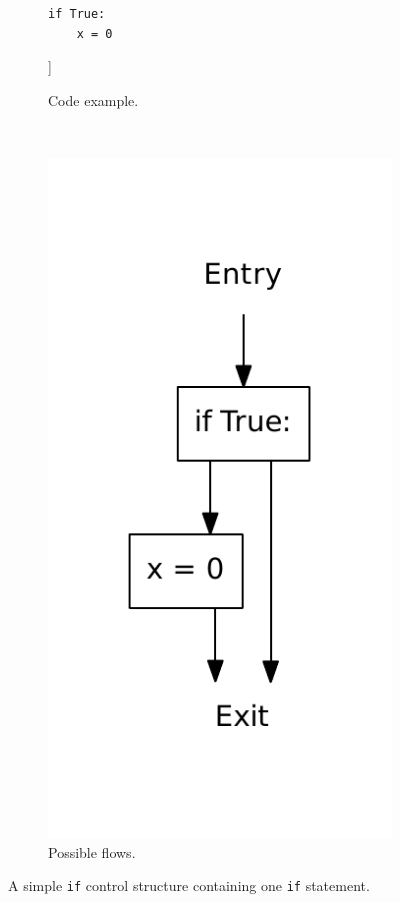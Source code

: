\begin{figure}[H]
  \centering
  \begin{subfigure}[b]{0.4\textwidth}
    \begin{lstlisting}[style=python]
if True:
    x = 0
    \end{lstlisting}
    \caption{Code example.}\label{python:if:simple:code}]
  \end{subfigure}
  ~ %
  \begin{subfigure}[b]{0.4\textwidth}
    \centering
    \includegraphics[scale=.4]{./figures/if.pdf}
    \caption{Possible flows.}
    \label{python:if:simple:flow}
  \end{subfigure}
  \caption{A simple \texttt{if} control structure containing one \texttt{if} statement.}
  \label{python:if:simple}
\end{figure}

